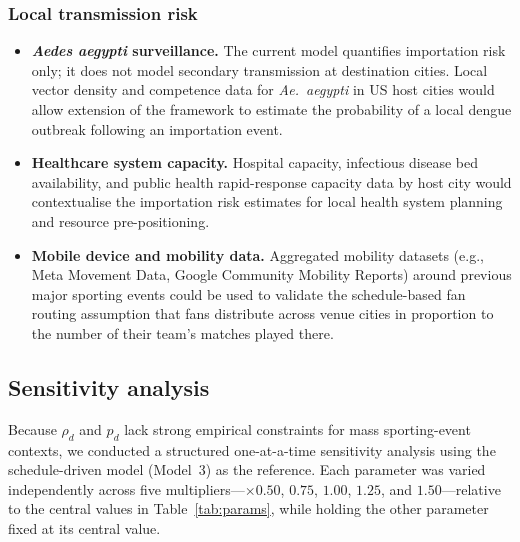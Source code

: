 \documentclass[12pt]{article}
\begin{document}
\subsubsection*{Local transmission risk}

\begin{itemize}

  \item \textbf{\textit{Aedes aegypti} surveillance.}
  The current model quantifies importation risk only; it does not
  model secondary transmission at destination cities. Local vector
  density and competence data for \textit{Ae.~aegypti} in US host
  cities would allow extension of the framework to estimate the
  probability of a local dengue outbreak following an importation event.

  \item \textbf{Healthcare system capacity.}
  Hospital capacity, infectious disease bed availability, and public
  health rapid-response capacity data by host city would contextualise
  the importation risk estimates for local health system planning and
  resource pre-positioning.

  \item \textbf{Mobile device and mobility data.}
  Aggregated mobility datasets (e.g., Meta Movement Data, Google
  Community Mobility Reports) around previous major sporting events
  could be used to validate the schedule-based fan routing assumption
  that fans distribute across venue cities in proportion to the number
  of their team's matches played there.

\end{itemize}

\subsection*{Sensitivity analysis}

Because $\rho_d$ and $p_d$ lack strong empirical constraints for
mass sporting-event contexts, we conducted a structured one-at-a-time
sensitivity analysis using the schedule-driven model (Model~3) as the
reference. Each parameter was varied independently across five
multipliers---$\times 0.50$, $0.75$, $1.00$, $1.25$, and
$1.50$---relative to the central values in Table~\ref{tab:params},
while holding the other parameter fixed at its central value.
\end{document}
